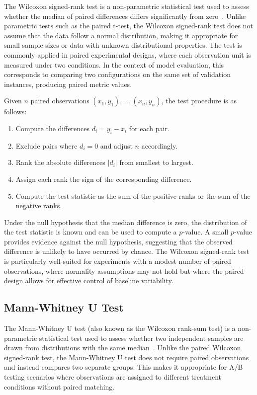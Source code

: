 The Wilcoxon signed-rank test is a non-parametric statistical test used to assess whether the median of paired differences differs significantly from zero~\cite{wilcoxon1945individual}. 
Unlike parametric tests such as the paired t-test, the Wilcoxon signed-rank test does not assume that the data follow a normal distribution, making it appropriate for small sample sizes or data with unknown distributional properties.
The test is commonly applied in paired experimental designs, where each observation unit is measured under two conditions. 
In the context of model evaluation, this corresponds to comparing two configurations on the same set of validation instances, producing paired metric values.

Given $n$ paired observations $(x_1, y_1), \ldots, (x_n, y_n)$, the test procedure is as follows:

\begin{enumerate}
    \item Compute the differences $d_i = y_i - x_i$ for each pair.
    \item Exclude pairs where $d_i = 0$ and adjust $n$ accordingly.
    \item Rank the absolute differences $|d_i|$ from smallest to largest.
    \item Assign each rank the sign of the corresponding difference.
    \item Compute the test statistic as the sum of the positive ranks or the sum of the negative ranks.
\end{enumerate}

Under the null hypothesis that the median difference is zero, the distribution of the test statistic is known and can be used to compute a $p$-value. A small $p$-value provides evidence against the null hypothesis, suggesting that the observed difference is unlikely to have occurred by chance.
The Wilcoxon signed-rank test is particularly well-suited for experiments with a modest number of paired observations, where normality assumptions may not hold but where the paired design allows for effective control of baseline variability.

\subsection{Mann-Whitney U Test}
\label{subsec:mann_whitney}

The Mann-Whitney U test (also known as the Wilcoxon rank-sum test) is a non-parametric statistical test used to assess whether two independent samples are drawn from distributions with the same median~\cite{mann1947test}. Unlike the paired Wilcoxon signed-rank test, the Mann-Whitney U test does not require paired observations and instead compares two separate groups. This makes it appropriate for A/B testing scenarios where observations are assigned to different treatment conditions without paired matching.

